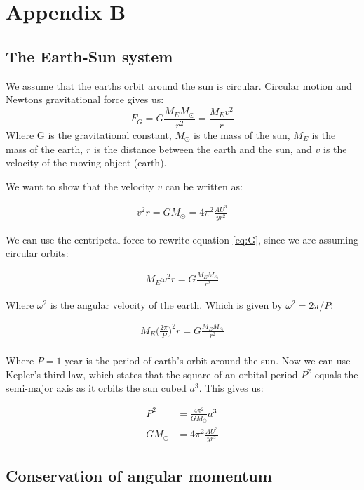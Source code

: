 \documentclass{article}
\begin{document}
\section*{Appendix B} %
\subsection{The Earth-Sun system}
We assume that the earths orbit around the sun is circular. Circular motion and Newtons gravitational force gives us:
\begin{equation}
    F_G=G\frac{M_EM_{\odot}}{r^2}=\frac{M_Ev^2}{r}
    \label{eq:G}
\end{equation}
Where G is the gravitational constant, $M_\odot$ is the mass of the sun, $M_E$ is the mass of the earth, $r$ is the distance between the earth and the sun, and $v$ is the velocity of the moving object (earth). 

We want to show that the velocity $v$ can be written as:

\begin{align}
    v^2r=GM_{\odot}=4\pi^2\frac{AU^3}{yr^2}
    \label{eq:vr}
\end{align}

We can use the centripetal force to rewrite equation \ref{eq:G}, since we are assuming circular orbits:

\begin{align*}
    M_E\omega^2r=G\frac{M_EM_{\odot}}{r^2}
\end{align*}

Where $\omega^2$ is the angular velocity of the earth. Which is given by $\omega^2=2\pi / P$: 

\begin{align*}
    M_E\bigg(\frac{2\pi}{P}\bigg)^2r=G\frac{M_EM_{\odot}}{r^2}\\
\end{align*}

Where $P=1$ year is the period of earth's orbit around the sun.
Now we can use Kepler's third law, which states that the square of an orbital period $P^2$ equals the semi-major axis as it orbits the sun cubed $a^3$. This gives us:

\begin{align}
    P^2&=\frac{4\pi^2}{GM_\odot}a^3\\
    GM_\odot&=4\pi^2\frac{AU^3}{yr^2}
\end{align}

\subsection{Conservation of angular momentum}
\end{document}
